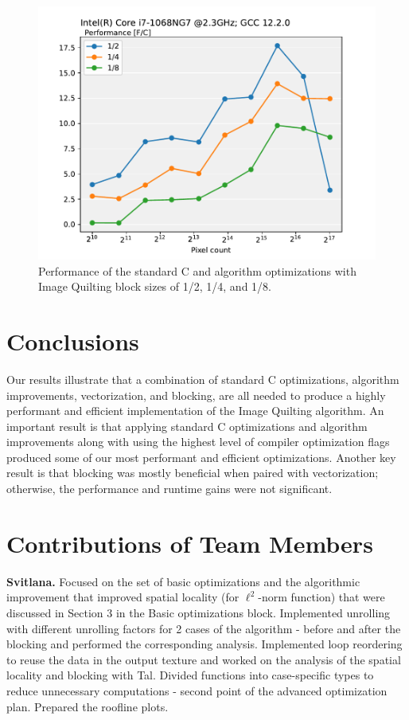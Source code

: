 \documentclass[letterpaper]{article}
\newcommand{\mypar}[1]{{\bf #1.}}
\begin{document}
\begin{figure}[htb]
  \centering
    \includegraphics[scale=0.45]{248Performances.pdf}
    \caption{Performance of the standard C and algorithm optimizations with Image Quilting block sizes of 1/2, 1/4, and 1/8.
    \label{248Performances}}
  \end{figure}

\section{Conclusions}

Our results illustrate that a combination of standard C optimizations, algorithm improvements, vectorization, and blocking, are all needed to produce a highly performant and efficient implementation of the Image Quilting algorithm. An important result is that applying standard C optimizations and algorithm improvements along with using the highest level of compiler optimization flags produced some of our most performant and efficient optimizations. Another key result is that blocking was mostly beneficial when paired with vectorization; otherwise, the performance and runtime gains were not significant.

\section{Contributions of Team Members}

\mypar{Svitlana} Focused on the set of basic optimizations and the algorithmic improvement that improved spatial locality (for $\ell ^2$-norm function) that were discussed in Section 3 in the Basic optimizations block. Implemented unrolling with different unrolling factors for 2 cases of the algorithm - before and after the blocking and performed the corresponding analysis. Implemented loop reordering to reuse the data in the output texture and worked on the analysis of the spatial locality and blocking with Tal. Divided functions into case-specific types to reduce unnecessary computations - second point of the advanced optimization plan. Prepared the roofline plots.
\end{document}
